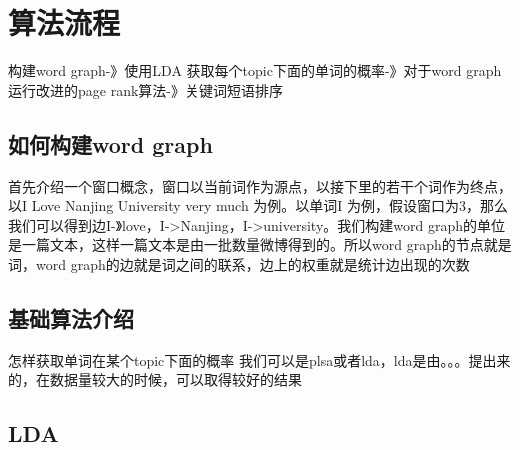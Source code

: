 \documentclass[master]{njuthesis}
\begin{document}
\section{算法流程}

构建word graph-》使用LDA 获取每个topic下面的单词的概率-》对于word graph运行改进的page rank算法-》关键词短语排序

\subsection{如何构建word graph}

首先介绍一个窗口概念，窗口以当前词作为源点，以接下里的若干个词作为终点，以I  Love Nanjing University very much 为例。以单词I 为例，假设窗口为3，那么我们可以得到边I-》love，I->Nanjing，I->university。我们构建word graph的单位是一篇文本，这样一篇文本是由一批数量微博得到的。所以word graph的节点就是词，word graph的边就是词之间的联系，边上的权重就是统计边出现的次数
 
\subsection{基础算法介绍}

怎样获取单词在某个topic下面的概率
我们可以是plsa或者lda，lda是由。。。提出来的，在数据量较大的时候，可以取得较好的结果

\subsection{LDA}
\end{document}
